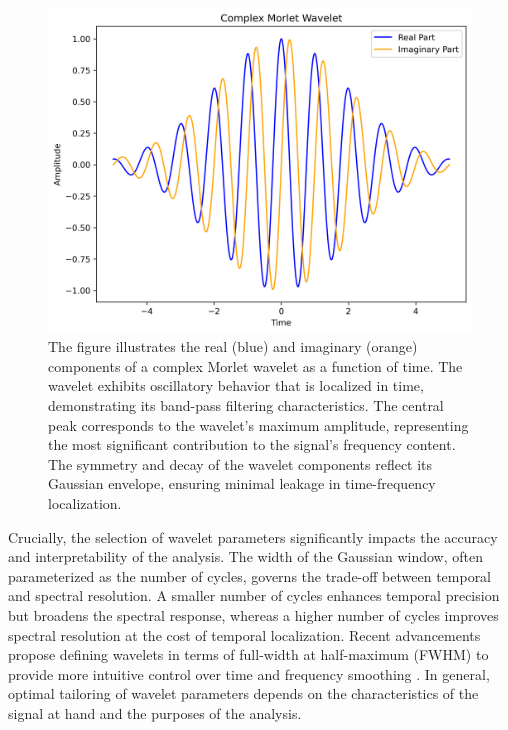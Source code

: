 \documentclass{article}
\begin{document}
 \begin{figure}[htbp]
    \centering
    \includegraphics[width=\linewidth]{wavelet.png}
    \caption[Real and imaginary parts of a Morlet wavelet]{The figure illustrates the real (blue) and imaginary (orange) components of a complex Morlet wavelet as a function of time. The wavelet exhibits oscillatory behavior that is localized in time, demonstrating its band-pass filtering characteristics. The central peak corresponds to the wavelet's maximum amplitude, representing the most significant contribution to the signal's frequency content. The symmetry and decay of the wavelet components reflect its Gaussian envelope, ensuring minimal leakage in time-frequency localization. }
    \label{fig:wavelet}
\end{figure}

Crucially, the selection of wavelet parameters significantly impacts the accuracy and interpretability of the analysis. The width of the Gaussian window, often parameterized as the number of cycles, governs the trade-off between temporal and spectral resolution. A smaller number of cycles enhances temporal precision but broadens the spectral response, whereas a higher number of cycles improves spectral resolution at the cost of temporal localization. Recent advancements propose defining wavelets in terms of full-width at half-maximum (FWHM) to provide more intuitive control over time and frequency smoothing \cite{cohen2019}. In general, optimal tailoring of wavelet parameters depends on the characteristics of the signal at hand and the purposes of the analysis.
\end{document}
